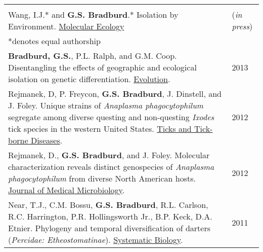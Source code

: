 \documentclass{article}
\begin{document}
\begin{tabular}{>{\everypar{\hangindent1cm}}p{}p{}}
\hfill\\
Wang, I.J.* and \textbf{G.S. Bradburd}.* Isolation by Environment. \underline{Molecular Ecology}  & \hfill (\textit{in press})\\
\hspace{4.5mm} *denotes equal authorship&\\
%
\vspace{-0.1cm}
%
\textbf{Bradburd, G.S.}, P.L. Ralph, and G.M. Coop. Disentangling the effects of geographic and ecological isolation on genetic differentiation. \underline{Evolution}. & \hfill 2013 \\
%
\vspace{-0.1cm}
%
Rejmanek, D, P. Freycon, \textbf{G.S. Bradburd}, J. Dinstell, and J. Foley.  Unique strains of \textit{Anaplasma phagocytophilum} segregate among diverse questing and non-questing \textit{Ixodes} tick species in the western United States.  \underline{Ticks and Tick-borne Diseases}. & \hfill 2012\\
%
\vspace{-0.1cm}
%
Rejmanek, D., \textbf{G.S. Bradburd}, and J. Foley.  Molecular characterization reveals distinct genospecies of \textit{Anaplasma phagocytophilum} from diverse North American hosts.	\underline{Journal of Medical Microbiology}. & \hfill 2012\\
%
\vspace{-0.1cm}
%
Near, T.J., C.M. Bossu, \textbf{G.S. Bradburd}, R.L. Carlson, R.C. Harrington, P.R. Hollingsworth	Jr., B.P. Keck, D.A. Etnier.  Phylogeny and temporal diversification of darters (\textit{Percidae: Etheostomatinae}).  \underline{Systematic Biology}. & \hfill 2011\\
%
\end{tabular}
\end{document}
